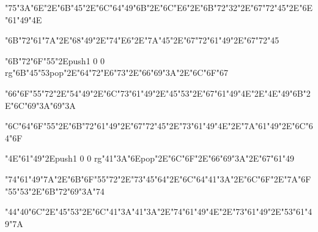 \centerline{\ipa\char"75\ipa\char"3A\ipa\char"6E\ipa\char"2E\ipa\char"6B\ipa\char"45\ipa\char"2E\ipa\char"6C\ipa\char"64\ipa\char"49\ipa\char"6B\ipa\char"2E\ipa\char"6C\ipa\char"E6\ipa\char"2E\ipa\char"6B\ipa\char"72\ipa\char"32\ipa\char"2E\ipa\char"67\ipa\char"72\ipa\char"45\ipa\char"2E\ipa\char"6E\ipa\char"61\ipa\char"49\ipa\char"4E}\bigskip
\centerline{\ipa\char"6B\ipa\char"72\ipa\char"61\ipa\char"7A\ipa\char"2E\ipa\char"68\ipa\char"49\ipa\char"2E\ipa\char"74\ipa\char"E6\ipa\char"2E\ipa\char"7A\ipa\char"45\ipa\char"2E\ipa\char"67\ipa\char"72\ipa\char"61\ipa\char"49\ipa\char"2E\ipa\char"67\ipa\char"72\ipa\char"45}
\vfill\eject
\null\vfill
\centerline{\ipa\char"6B\ipa\char"72\ipa\char"6F\ipa\char"55\ipa\char"2E\pdfcolorstack\match push{1 0 0 rg}\ipa\char"6B\ipa\char"45\ipa\char"53\pdfcolorstack\match pop{}\ipa\char"2E\ipa\char"64\ipa\char"72\ipa\char"E6\ipa\char"73\ipa\char"2E\ipa\char"66\ipa\char"69\ipa\char"3A\ipa\char"2E\ipa\char"6C\ipa\char"6F\ipa\char"67}\bigskip
\centerline{\ipa\char"66\ipa\char"6F\ipa\char"55\ipa\char"72\ipa\char"2E\ipa\char"54\ipa\char"49\ipa\char"2E\ipa\char"6C\ipa\char"73\ipa\char"61\ipa\char"49\ipa\char"2E\ipa\char"45\ipa\char"53\ipa\char"2E\ipa\char"67\ipa\char"61\ipa\char"49\ipa\char"4E\ipa\char"2E\ipa\char"4E\ipa\char"49\ipa\char"6B\ipa\char"2E\ipa\char"6C\ipa\char"69\ipa\char"3A\ipa\char"69\ipa\char"3A}\bigskip
\centerline{\ipa\char"6C\ipa\char"64\ipa\char"6F\ipa\char"55\ipa\char"2E\ipa\char"6B\ipa\char"72\ipa\char"61\ipa\char"49\ipa\char"2E\ipa\char"67\ipa\char"72\ipa\char"45\ipa\char"2E\ipa\char"73\ipa\char"61\ipa\char"49\ipa\char"4E\ipa\char"2E\ipa\char"7A\ipa\char"61\ipa\char"49\ipa\char"2E\ipa\char"6C\ipa\char"64\ipa\char"6F}
\vfill\eject
\null\vfill
\centerline{\ipa\char"4E\ipa\char"61\ipa\char"49\ipa\char"2E\pdfcolorstack\match push{1 0 0 rg}\ipa\char"41\ipa\char"3A\ipa\char"6E\pdfcolorstack\match pop{}\ipa\char"2E\ipa\char"6C\ipa\char"6F\ipa\char"2E\ipa\char"66\ipa\char"69\ipa\char"3A\ipa\char"2E\ipa\char"67\ipa\char"61\ipa\char"49}\bigskip
\centerline{\ipa\char"74\ipa\char"61\ipa\char"49\ipa\char"7A\ipa\char"2E\ipa\char"6B\ipa\char"6F\ipa\char"55\ipa\char"72\ipa\char"2E\ipa\char"73\ipa\char"45\ipa\char"64\ipa\char"2E\ipa\char"6C\ipa\char"64\ipa\char"41\ipa\char"3A\ipa\char"2E\ipa\char"6C\ipa\char"6F\ipa\char"2E\ipa\char"7A\ipa\char"6F\ipa\char"55\ipa\char"53\ipa\char"2E\ipa\char"6B\ipa\char"72\ipa\char"69\ipa\char"3A\ipa\char"74}\bigskip
\centerline{\ipa\char"44\ipa\char"40\ipa\char"6C\ipa\char"2E\ipa\char"45\ipa\char"53\ipa\char"2E\ipa\char"6C\ipa\char"41\ipa\char"3A\ipa\char"41\ipa\char"3A\ipa\char"2E\ipa\char"74\ipa\char"61\ipa\char"49\ipa\char"4E\ipa\char"2E\ipa\char"73\ipa\char"61\ipa\char"49\ipa\char"2E\ipa\char"53\ipa\char"61\ipa\char"49\ipa\char"7A}
